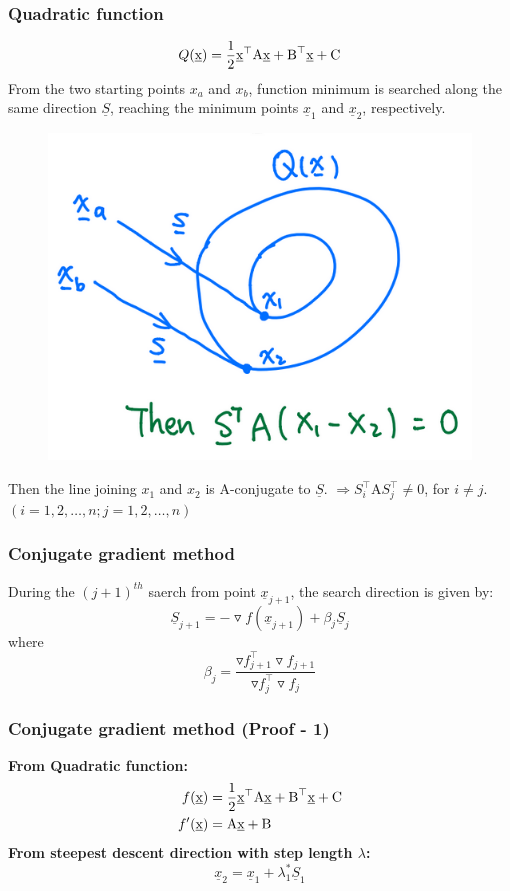 \documentclass{beamer}
\begin{document}
\begin{frame}
    \frametitle{Quadratic function}
    $$Q(\textrm{\underline{x}})=\frac{1}{2}\textrm{\underline{x}}^\top\textrm{A}\textrm{\underline{x}}+
    \textrm{B}^\top\textrm{\underline{x}}+\textrm{C}
    $$
    From the two starting points $x_a$ and $x_b$, function minimum is searched along the same direction $\underline{S}$,
    reaching the minimum points $\underline{x}_1$ and $\underline{x}_2$, respectively.
    \begin{figure}
    \includegraphics[scale=0.2]{img/quadratic.png}
    \centering
    \end{figure}
    Then the line joining $x_1$ and $x_2$ is $\textrm{A}$-conjugate to $\underline{S}$.
    $\Rightarrow S_i^\top\textrm{A}S_j^\top\neq 0$, for $i\neq j$. $(i=1, 2, \dots,n; j=1,2,\dots,n)$
\end{frame}

\begin{frame}
    \frametitle{Conjugate gradient method}
    During the $(j+1)^{th}$ saerch from point $\underline{x}_{j+1}$, the search direction is given by:
    $$\underline{S}_{j+1}=-\triangledown f(\underline{x}_{j+1})+\beta_j \underline{S}_j$$
    where $$\beta_j=\frac{\triangledown f_{j+1}^\top\triangledown f_{j+1}}{\triangledown f_{j}^\top\triangledown f_{j}}$$
\end{frame}

\begin{frame}
    \frametitle{Conjugate gradient method (Proof - 1)}
    \textbf{From Quadratic function:}
    \begin{align*}f(\textrm{\underline{x}})&=\frac{1}{2}\textrm{\underline{x}}^\top\textrm{A}\textrm{\underline{x}}+
    \textrm{B}^\top\textrm{\underline{x}}+\textrm{C} \\
    f'(\textrm{\underline{x}})&=\textrm{A}\textrm{\underline{x}}+\textrm{B}
    \end{align*}
    \textbf{From steepest descent direction with step length $\lambda$:}
    $$\underline{x}_2=\underline{x}_1+\lambda_1^*\underline{S}_1$$
\end{frame}
\end{document}
